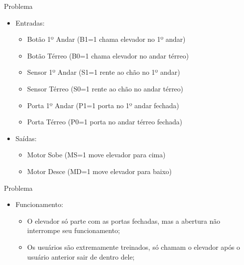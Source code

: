 

\subtitle{Máquinas de Estados Finitos: Exercícios} %



\begin{frame}
	\titlepage
\end{frame} 

\begin{frame}{Problema}
\begin{itemize}
 \item Entradas: 
    \begin{itemize}
     \item Botão 1º Andar (B1=1 chama elevador no 1º andar)
     \item Botão Térreo (B0=1 chama elevador no andar térreo)
     \item Sensor 1º Andar (S1=1 rente ao chão no 1º andar)
     \item Sensor Térreo (S0=1 rente ao chão no andar térreo)
     \item Porta 1º Andar (P1=1 porta no 1º andar fechada)
     \item Porta Térreo (P0=1 porta no andar térreo fechada)
    \end{itemize}
 \item Saídas:
    \begin{itemize}
     \item Motor Sobe (MS=1 move elevador para cima)
     \item Motor Desce (MD=1 move elevador para baixo)
    \end{itemize}
\end{itemize}
\end{frame}
    
    
\begin{frame}{Problema}
\begin{itemize}
 \item Funcionamento:
    \begin{itemize}
     \item O elevador só parte com as portas fechadas, mas a abertura não interrompe seu funcionamento; 
     \item Os usuários são extremamente treinados, só chamam o elevador após o usuário anterior sair de dentro dele; 
    \end{itemize}
\end{itemize}
\end{frame}



